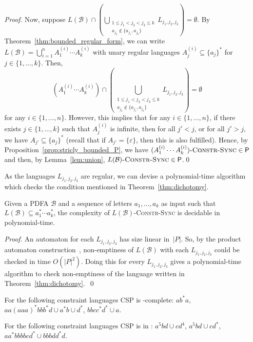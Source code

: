 \begin{proof}
 
 Now, suppose
  $
 L(\mathcal B) \cap \left(\bigcup_{\substack{1 \le j_1 < j_2 < j_3 \le k \\ a_{j_2} \notin \{a_{j_1}, a_{j_3}\} }} L_{j_1,j_2,j_3} \right) = \emptyset.
 $
  By Theorem~\ref{thm:bounded_regular_form}, we can
 write %
 $L(\mathcal B) = \bigcup_{i=1}^n A_1^{(i)} \cdots A_k^{(i)}$ %
 with unary regular languages $A_j^{(i)} \subseteq \{a_j\}^*$
 for $j \in \{1,\ldots,k\}$.
 Then, 
 \[ 
 ( A_1^{(i)} \cdots A_k^{(i)} ) \cap \left(\bigcup_{\substack{1 \le j_1 < j_2 < j_3 \le k \\ a_{j_2} \notin \{a_{j_1}, a_{j_3}\} }} L_{j_1,j_2,j_3} \right) = \emptyset
 \]
 for any $i \in \{1, \ldots, n\}$.
 However, this implies that for any $i \in \{1,\ldots,n\}$, if there exists $j \in \{1,\ldots, k\}$
 such that $A_j^{(i)}$ is infinite, 
 then for all $j' < j$, or for all $j' > j$, %
 we have $A_{j'} \subseteq \{a_j\}^*$ (recall that if $A_{j'} = \{\varepsilon\}$, then
 this is also fulfilled).
 Hence, by Proposition~\ref{prop:stricly_bounded_P},
 we have $(A_1^{(i)} \cdots A_k^{(i)})\textsc{-Constr-Sync} \in \textsf{P}$
 and then, by Lemma~\ref{lem:union},
 $L(\mathcal B)\textsc{-Constr-Sync} \in \textsf{P}$.\qed
\end{proof}

As the languages $L_{j_1, j_2, j_3}$ are regular, we
can devise a polynomial-time algorithm which checks the condition
mentioned in Theorem~\ref{thm:dichotomy}. 
 
\begin{corollary} %
 Given a PDFA $\mathcal B$ and a sequence of letters $a_1, \ldots, a_k$
 as input such that $L(\mathcal B) \subseteq a_1^* \cdots a_k^*$,
 the complexity of $L(\mathcal B)$\textsc{-Constr-Sync}
 is decidable in polynomial-time.
\end{corollary}
\begin{proof}
 An automaton for each $L_{j_1, j_2, j_3}$
 has size linear in~$|P|$. So, by the product automaton construction~\cite{HopUll79}, non-emptiness of
 $L(\mathcal B)$ with each $L_{j_1, j_2, j_3}$
 could be checked in time $O(|P|^2)$.
 Doing this for every $L_{j_1, j_2, j_3}$
 gives a polynomial-time algorithm
 to check non-emptiness of the language written
 in Theorem~\ref{thm:dichotomy}.~\qed
\end{proof}

\begin{example}
 For the following constraint languages CSP is \NP-complete: $ab^*a$,
 $aa(aaa)^*bbb^*d \cup a^*b \cup d^*$, $bbcc^*d^* \cup a$.
 
 For the following constraint languages CSP is in \PTIME: $a^5bd \cup cd^4$,
 $a^5bd \cup cd^*$, $aa^*bbbbcd^* \cup bbbdd^*d$.
\end{example}

